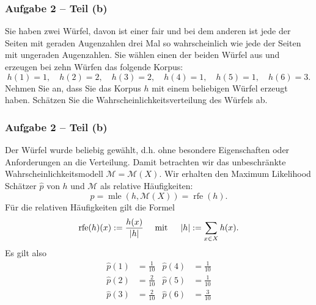 \documentclass{beamer}
\DeclareMathOperator{\rfe}{rfe}
\begin{document}
\begin{frame} \frametitle{Aufgabe 2 -- Teil (b)}
	\justifying \small
	Sie haben zwei Würfel, davon ist einer fair und bei dem anderen ist jede der Seiten mit geraden Augenzahlen drei Mal so wahrscheinlich wie jede der Seiten mit ungeraden Augenzahlen. Sie wählen einen der beiden Würfel aus und erzeugen bei zehn Würfen das folgende Korpus:
	\begin{equation*}
		h(1) = 1, \quad h(2) = 2, \quad h(3) = 2, \quad h(4) = 1, \quad h(5) = 1, \quad h(6) = 3.
	\end{equation*}
	Nehmen Sie an, dass Sie das Korpus $h$ mit einem beliebigen Würfel erzeugt haben. Schätzen
	Sie die Wahrscheinlichkeitsverteilung des Würfels ab.

\end{frame}

\begin{frame} \frametitle{Aufgabe 2 -- Teil (b)}
	\justifying \footnotesize
	Der Würfel wurde beliebig gewählt, d.h. ohne besondere Eigenschaften oder Anforderungen an die Verteilung. Damit betrachten wir das unbeschränkte Wahrscheinlichkeitsmodell $\mathcal{M} = \mathcal{M}(X)$. Wir erhalten den Maximum Likelihood Schätzer $\hat{p}$ von $h$ und $\mathcal{M}$ als relative Häufigkeiten:
	\begin{equation*}
		\hat{p} = \operatorname{mle}(h, \mathcal{M}(X)) = \operatorname{rfe}(h).
	\end{equation*}
	Für die relativen Häufigkeiten gilt die Formel
	\begin{equation*}
		\rfe(h)(x) \defeq \frac{h(x)}{\abs{h}} \quad \mit \quad \abs{h} \defeq \sum_{x \in X} h(x).
	\end{equation*}
	Es gilt also
	\begin{align*}
		\hat{p}(1) &= \frac{1}{10} & \hat{p}(4) &= \frac{1}{10} \\
		\hat{p}(2) &= \frac{2}{10} & \hat{p}(5) &= \frac{1}{10} \\
		\hat{p}(3) &= \frac{2}{10} & \hat{p}(6) &= \frac{3}{10}
	\end{align*}
\end{frame}
\end{document}
